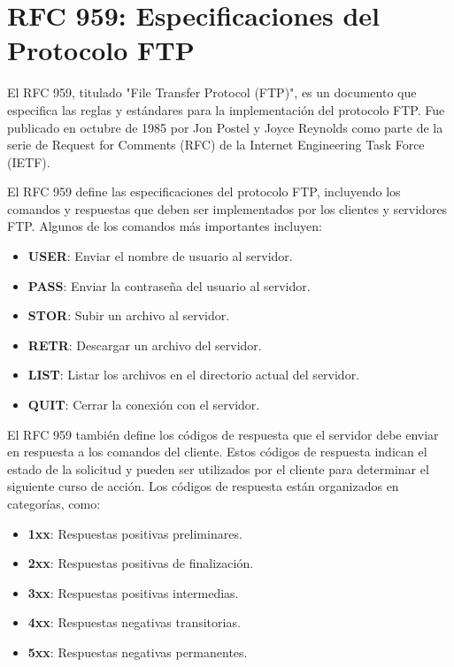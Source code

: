 \documentclass[a4paper, 12pt]{article}
\begin{document}
\section{RFC 959: Especificaciones del Protocolo FTP}
El RFC 959, titulado "File Transfer Protocol (FTP)", es un documento que especifica las reglas y estándares para la implementación del protocolo FTP. Fue publicado en octubre de 1985 por Jon Postel y Joyce Reynolds como parte de la serie de Request for Comments (RFC) de la Internet Engineering Task Force (IETF).

El RFC 959 define las especificaciones del protocolo FTP, incluyendo los comandos y respuestas que deben ser implementados por los clientes y servidores FTP. Algunos de los comandos más importantes incluyen:

\begin{itemize}
    \item \textbf{USER}: Enviar el nombre de usuario al servidor.
    \item \textbf{PASS}: Enviar la contraseña del usuario al servidor.
    \item \textbf{STOR}: Subir un archivo al servidor.
    \item \textbf{RETR}: Descargar un archivo del servidor.
    \item \textbf{LIST}: Listar los archivos en el directorio actual del servidor.
    \item \textbf{QUIT}: Cerrar la conexión con el servidor.
\end{itemize}

El RFC 959 también define los códigos de respuesta que el servidor debe enviar en respuesta a los comandos del cliente. Estos códigos de respuesta indican el estado de la solicitud y pueden ser utilizados por el cliente para determinar el siguiente curso de acción. Los códigos de respuesta están organizados en categorías, como:

\begin{itemize}
    \item \textbf{1xx}: Respuestas positivas preliminares.
    \item \textbf{2xx}: Respuestas positivas de finalización.
    \item \textbf{3xx}: Respuestas positivas intermedias.
    \item \textbf{4xx}: Respuestas negativas transitorias.
    \item \textbf{5xx}: Respuestas negativas permanentes.
\end{itemize}
\end{document}
